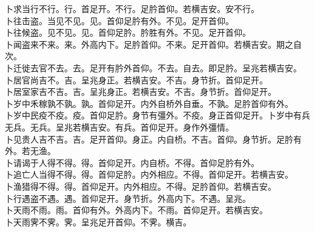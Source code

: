 \documentclass{zhvt-classic}
\begin{document}
\hspace*{2em}卜求当行不行。行。首足开。不行。足肣首仰。若横吉安。安不行。\\
\hspace*{2em}卜往击盗。当见不见。见。首仰足肣有外。不见。足开首仰。\\
\hspace*{2em}卜往候盗。见不见。见。首仰足肣。肣胜有外。不见。足开首仰。\\
\hspace*{2em}卜闻盗来不来。来。外高内下。足肣首仰。不来。足开首仰。若横吉安。期之自次。\\
\hspace*{2em}卜迁徙去官不去。去。足开有肣外首仰。不去。自去。即足肣。呈兆若横吉安。\\
\hspace*{2em}卜居官尚吉不。吉。呈兆身正。若横吉安。不吉。身节折。首仰足开。\\
\hspace*{2em}卜居室家吉不吉。吉。呈兆身正。若横吉安。不吉。身节折。首仰足开。\\
\hspace*{2em}卜岁中禾稼孰不孰。孰。首仰足开。内外自桥外自垂。不孰。足肣首仰有外。\\
\hspace*{2em}卜岁中民疫不疫。疫。首仰足肣。身节有彊外。不疫。身正首仰足开。卜岁中有兵无兵。无兵。呈兆若横吉安。有兵。首仰足开。身作外彊情。\\
\hspace*{2em}卜见贵人吉不吉。吉。足开首仰。身正。内自桥。不吉。首仰。身节折。足肣有外。若无渔。\\
\hspace*{2em}卜请谒于人得不得。得。首仰足开。内自桥。不得。首仰足肣有外。\\
\hspace*{2em}卜追亡人当得不得。得。首仰足肣。内外相应。不得。首仰足开。若横吉安。\\
\hspace*{2em}卜渔猎得不得。得。首仰足开。内外相应。不得。足肣首仰。若横吉安。\\
\hspace*{2em}卜行遇盗不遇。遇。首仰足开。身节折。外高内下。不遇。呈兆。\\
\hspace*{2em}卜天雨不雨。雨。首仰有外。外高内下。不雨。首仰足开。若横吉安。\\
\hspace*{2em}卜天雨霁不霁。霁。呈兆足开首仰。不霁。横吉。\\
\end{document}
